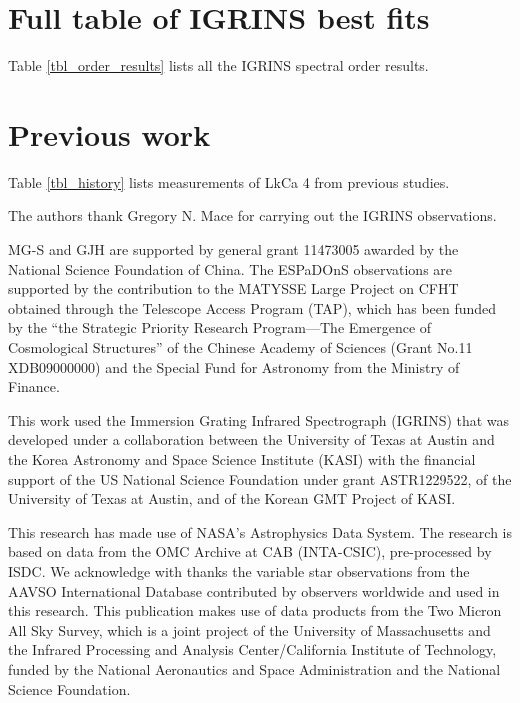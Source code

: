 \documentclass[twocolumn]{emulateapj}%
\newcommand{\name}{LkCa 4 }
\begin{document}

\section{Full table of IGRINS best fits}

Table \ref{tbl_order_results} lists all the IGRINS spectral order results.
\LongTables


\section{Previous work}

Table \ref{tbl_history} lists measurements of \name from previous studies.




\acknowledgements
The authors thank Gregory N. Mace for carrying out the IGRINS observations. 

MG-S and GJH are supported by general grant 11473005 awarded by the National Science Foundation of China.   The ESPaDOnS observations are supported by the contribution to the MATYSSE Large Project on CFHT obtained through the Telescope Access Program (TAP), which has been funded by the ``the Strategic Priority Research Program---The Emergence of Cosmological Structures'' of the Chinese Academy of Sciences (Grant No.11 XDB09000000) and the Special Fund for Astronomy from the Ministry of Finance. 

This work used the Immersion Grating Infrared Spectrograph (IGRINS) that was developed under a collaboration between the University of Texas at Austin and the Korea Astronomy and Space Science Institute (KASI) with the financial support of the US National Science Foundation under grant ASTR1229522, of the University of Texas at Austin, and of the Korean GMT Project of KASI.

This research has made use of NASA's Astrophysics Data System.  The research is based on data from the OMC Archive at CAB (INTA-CSIC), pre-processed by ISDC.
We acknowledge with thanks the variable star observations from the AAVSO International Database contributed by observers worldwide and used in this research.
This publication makes use of data products from the Two Micron All Sky Survey, which is a joint project of the University of Massachusetts and the Infrared Processing and Analysis Center/California Institute of Technology, funded by the National Aeronautics and Space Administration and the National Science Foundation.
\end{document}
